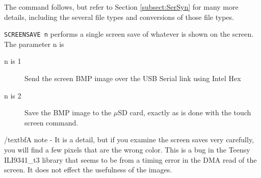 The command follows, but refer to Section \ref{subsect:SerSyn} for many more details, including the several file types and conversions of those file types.

\texttt{SCREENSAVE n} performs a single screen save of whatever is shown on the screen.  The parameter n is
\begin{description}
\item[n is 1] Send the screen BMP image over the USB Serial link using Intel Hex
\item[n is 2] Save the BMP image to the $\mu$SD card, exactly as is done with the touch screen command.
\end{description}

/textbf{A note - }It is a detail, but if you examine the screen saves very carefully, you will find a few pixels that are the wrong color. This is a bug in the Teensy ILI9341\_t3 library that seems to be from a timing error in the DMA read of the screen. It does not effect the usefulness of the images.